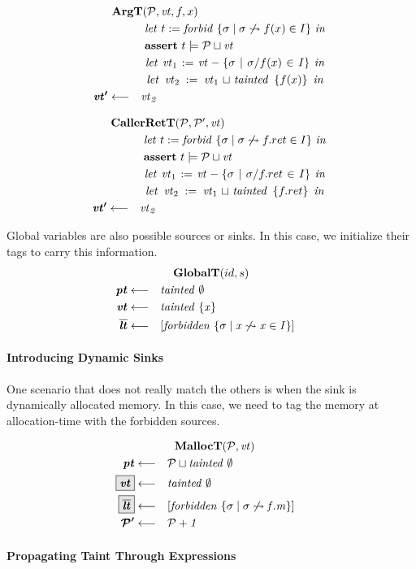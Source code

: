 \documentclass[acmsmall,review,anonymous]{acmart}\settopmatter{printfolios=true,printccs=false,printacmref=false}
\begin{document}
\begin{minipage}[t]{.49\textwidth}
  \[\begin{aligned}
  \truledef{\argt}
  \letin{t := \mathit{forbid} ~ \{\sigma \mid \sigma \not \rightsquigarrow f(x) \in I\}}
  \assert{t \models \PCT \sqcup \vt}
  \letin{\vt_1 := \vt - \{\sigma \mid \sigma / f(x) \in I \}}
  \letin{\vt_2 := \vt_1 \sqcup \mathit{tainted} ~ \{f(x)\}}
  \settag{\vt'}{\vt_2}
  \end{aligned}\]
\end{minipage}
\begin{minipage}[t]{.49\textwidth}            
  \[\begin{aligned}
  \truledef{\callerrett}
  \letin{t := \mathit{forbid} ~ \{\sigma \mid \sigma \not \rightsquigarrow f.ret \in I\}}
  \assert{t \models \PCT \sqcup \vt}
  \letin{\vt_1 := \vt - \{\sigma \mid \sigma / f.ret \in I \}}
  \letin{\vt_2 := \vt_1 \sqcup \mathit{tainted} ~ \{f.ret\}}
  \settag{\vt'}{\vt_2}
  \end{aligned}\]
\end{minipage}

Global variables are also possible sources or sinks. In this case, we initialize their
tags to carry this information.
\[\begin{aligned}
\truledef{\globalt}
\settag{\pt}{\mathit{tainted} ~ \emptyset}
\settag{\vt}{\mathit{tainted} ~ \{x\}}
\settag{\overline{\lt}}{\left[\mathit{forbidden} ~ \{\sigma \mid x \not \rightsquigarrow x \in I\}\right]}
\end{aligned}\]

\paragraph{Introducing Dynamic Sinks}

One scenario that does not really match the others is when the sink is dynamically allocated
memory. In this case, we need to tag the memory at allocation-time with the forbidden
sources.

\[\begin{aligned}
\truledef{\malloct}
\settag{\pt}{\PCT \sqcup \mathit{tainted} ~ \emptyset}
\settagopt{\vt}{\mathit{tainted} ~ \emptyset}
\settagopt{\overline{\lt}}{\left[\mathit{forbidden} ~ \{\sigma \mid \sigma \not \rightsquigarrow f.m\} \right]}
\settag{\PCT'}{\PCT + 1}
\end{aligned}\]

\paragraph{Propagating Taint Through Expressions}
\end{document}
